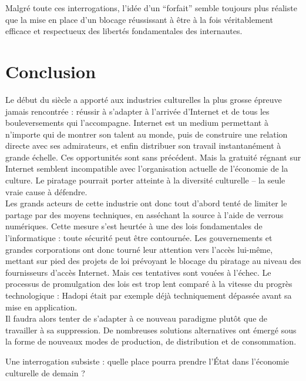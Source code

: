 \documentclass[a4paper]{report}
\begin{document}
	Malgré toute ces interrogations, l'idée d'un ``forfait'' semble toujours plus réaliste que la mise en place d'un blocage réussissant à être à la fois véritablement efficace et respectueux des libertés fondamentales des internautes.




	\chapter{Conclusion}
	Le début du siècle a apporté aux industries culturelles la plus grosse épreuve jamais rencontrée : réussir à s'adapter à l'arrivée d'Internet et de tous les bouleversements qui l'accompagne. Internet est un medium permettant à n'importe qui de montrer son talent au monde, puis de construire une relation directe avec ses admirateurs, et enfin distribuer son travail instantanément à grande échelle. Ces opportunités sont sans précédent. Mais la gratuité régnant sur Internet semblent incompatible avec l'organisation actuelle de l'économie de la culture. Le piratage pourrait porter atteinte à la diversité culturelle – la seule vraie cause à défendre.\\

	Les grands acteurs de cette industrie ont donc tout d'abord tenté de limiter le partage par des moyens techniques, en asséchant la source à l'aide de verrous numériques. Cette mesure s'est heurtée à une des lois fondamentales de l'informatique : toute sécurité peut être contournée. Les gouvernements et grandes corporations ont donc tourné leur attention vers l'accès lui-même, mettant sur pied des projets de loi prévoyant le blocage du piratage au niveau des fournisseurs d'accès Internet. Mais ces tentatives sont vouées à l'échec. Le processus de promulgation des lois est trop lent comparé à la vitesse du progrès technologique : Hadopi était par exemple déjà techniquement dépassée avant sa mise en application.\\

	Il faudra alors tenter de s'adapter à ce nouveau paradigme plutôt que de travailler à sa suppression. De nombreuses solutions alternatives ont émergé sous la forme de nouveaux modes de production, de distribution et de consommation.
	
	Une interrogation subsiste : quelle place pourra prendre l'État dans l'économie culturelle de demain ?




	
	




\end{document}
